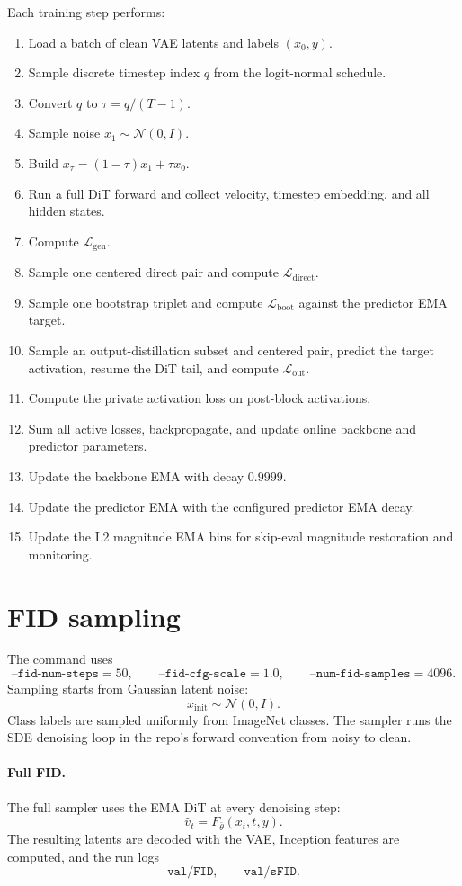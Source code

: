 \documentclass[11pt]{article}
\begin{document}
Each training step performs:
\begin{enumerate}
\item Load a batch of clean VAE latents and labels $(x_0,y)$.
\item Sample discrete timestep index $q$ from the logit-normal schedule.
\item Convert $q$ to $\tau=q/(T-1)$.
\item Sample noise $x_1\sim\mathcal{N}(0,I)$.
\item Build $x_\tau=(1-\tau)x_1+\tau x_0$.
\item Run a full DiT forward and collect velocity, timestep embedding, and all
  hidden states.
\item Compute $\mathcal{L}_{\mathrm{gen}}$.
\item Sample one centered direct pair and compute
  $\mathcal{L}_{\mathrm{direct}}$.
\item Sample one bootstrap triplet and compute
  $\mathcal{L}_{\mathrm{boot}}$ against the predictor EMA target.
\item Sample an output-distillation subset and centered pair, predict the target
  activation, resume the DiT tail, and compute $\mathcal{L}_{\mathrm{out}}$.
\item Compute the private activation loss on post-block activations.
\item Sum all active losses, backpropagate, and update online backbone and
  predictor parameters.
\item Update the backbone EMA with decay $0.9999$.
\item Update the predictor EMA with the configured predictor EMA decay.
\item Update the L2 magnitude EMA bins for skip-eval magnitude restoration and
  monitoring.
\end{enumerate}

\section{FID sampling}

The command uses
\[
  \texttt{--fid-num-steps}=50,\qquad
  \texttt{--fid-cfg-scale}=1.0,\qquad
  \texttt{--num-fid-samples}=4096.
\]
Sampling starts from Gaussian latent noise:
\[
  x_{\mathrm{init}}\sim\mathcal{N}(0,I).
\]
Class labels are sampled uniformly from ImageNet classes. The sampler runs the
SDE denoising loop in the repo's forward convention from noisy to clean.

\paragraph{Full FID.}
The full sampler uses the EMA DiT at every denoising step:
\[
  \hat v_t = F_{\bar\theta}(x_t,t,y).
\]
The resulting latents are decoded with the VAE, Inception features are computed,
and the run logs
\[
  \texttt{val/FID},\qquad \texttt{val/sFID}.
\]
\end{document}
